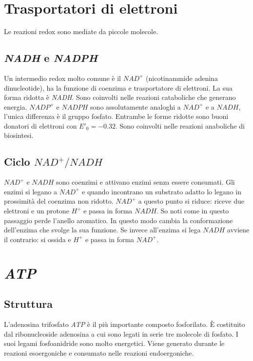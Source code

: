 \section{Trasportatori di elettroni}
Le reazioni redox sono mediate da piccole molecole. 

	\subsection{\emph{NADH} e \emph{NADPH}}
	Un intermedio redox molto comune \`e il \emph{$NAD^+$} (nicotinammide adenina dinucleotide), ha la funzione di coenzima e trasportatore di elettroni.
	La sua forma ridotta \`e \emph{NADH}. 
	Sono coinvolti nelle reazioni cataboliche che generano energia.
	\emph{$NADP^+$} e \emph{$NADPH$} sono assolutamente analoghi a \emph{$NAD^+$} e a \emph{$NADH$}, l'unica differenza \`e il gruppo fosfato.
	Entrambe le forme ridotte sono buoni donatori di elettroni con $E'_0=-0.32$.
	Sono coinvolti nelle reazioni anaboliche di biosintesi.
	
	\subsection{Ciclo \emph{$NAD^+/NADH$}}
	\emph{$NAD^+$} e \emph{$NADH$} sono coenzimi e attivano enzimi senza essere consumati.
	Gli enzimi si legano a \emph{$NAD^+$} e quando incontrano un substrato adatto lo legano in prossimit\`a del coenzima non ridotto.
	\emph{$NAD^+$} a questo punto si riduce: riceve due elettroni e un protone \emph{$H^+$} e passa in forma \emph{$NADH$}.
	So noti come in questo passaggio perde l'anello aromatico.
	In questo modo cambia la conformazione dell'enzima che svolge la sua funzione.
	Se invece all'enzima si lega \emph{$NADH$} avviene il contrario: si ossida e \emph{$H^+$} e passa in forma \emph{$NAD^+$}.

\section{\emph{ATP}}

	\subsection{Struttura}
	L'adenosina trifosfato \emph{ATP} \`e il pi\`u importante composto fosforilato. 
	\`E costituito dal ribonucleoside adenosina a cui sono legati in serie tre molecole di fosfato. 
	I suoi legami fosfoanidride sono molto energetici.
	Viene generato durante le reazioni esoergoniche e consumato nelle reazioni endoergoniche. 

